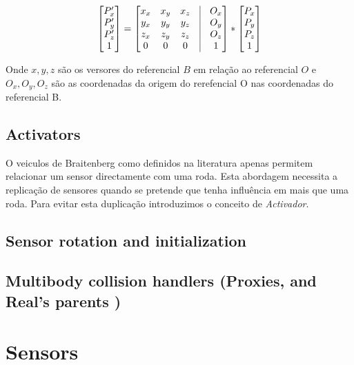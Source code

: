 \documentclass[a4paper]{article}
\begin{document}
\[
 	\begin{bmatrix}
		P_{x}' \\
		P_{y}' \\
		P_{z}' \\
		1 
	\end{bmatrix}
	=
	\begin{bmatrix}
		x_{x} & x_{y} & x_{z} & \vline & O_{x}	\\
		y_{x} & y_{y} & y_{z} & \vline & O_{y}	\\
		z_{x} & z_{y} & z_{z} & \vline & O_{z}	\\
		0 & 0 & 0 & \vline & 1 	\\
	\end{bmatrix}
	*
 	\begin{bmatrix}
		P_{x} \\
		P_{y} \\
		P_{z} \\
		1 
	\end{bmatrix}
\]

Onde $x, y, z$ são os versores do referencial $B$ em relação ao referencial $O$ e $O_{x}, O_{y}, O_{z}$ são as coordenadas da origem do rerefencial O nas coordenadas do referencial B. 

\cleardoublepage
\subsection{Activators}
\indent \indent O veiculos de Braitenberg como definidos na literatura apenas permitem relacionar um sensor directamente com uma roda.
Esta abordagem necessita a replicação de sensores quando se pretende que tenha influência em mais que uma roda.
Para evitar esta duplicação introduzimos o conceito de \emph{Activador}. 


\subsection{Sensor rotation and initialization}
\indent \indent 

\subsection{Multibody collision handlers (Proxies, and Real's parents )}
\indent \indent

\cleardoublepage
\section{Sensors}
\end{document}
